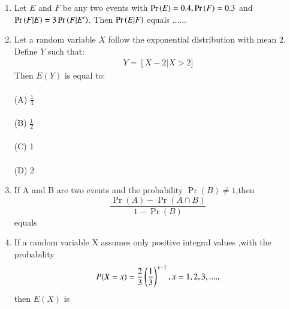\documentclass[journal,12pt,twocolumn]{IEEEtran}
\begin{document}
\begin{enumerate}
\begin{enumerate}
\end{enumerate}
%
  \solution
  
  \item  Let $E$ and $F$ be any two events with $\Pr\left(E\right)=0.4, \Pr\left(F\right)=0.3$
and $\Pr\left(F|E\right)=3 \Pr\left(F|E'\right)$. Then $\Pr\left(E|F\right)$ equals ......
\\
  \solution
  
%
\item Let a random variable $X$ follow the exponential distribution with mean 2. Define $Y$ such that:
\begin{align}
   Y =  \left[X-2\right|X>2]\nonumber
\end{align}
Then $E(Y)$ is equal to:\\
\\(A) $\frac{1}{4}$\\
\\(B) $\frac{1}{2}$\\
\\(C) 1\\
\\(D) 2\\
\item If A and B are two events and the probability $\Pr(B) \neq 1$,then\\
\begin{equation}
    \frac{\Pr(A)-\Pr(A \cap B)}{1-\Pr{(B)}}
\end{equation}
equals
\begin{enumerate}
\end{enumerate}
  \solution
  
%
\item If a random variable X assumes only positive integral values ,with the probability
\begin{equation}
 P(X=x)=\frac{2}{3}\left(\frac{1}{3}\right)^{x-1},x=1,2,3,....,   
\end{equation}
then $E(X)$ is 
\begin{enumerate}
\end{enumerate}
\end{enumerate}
\end{document}
